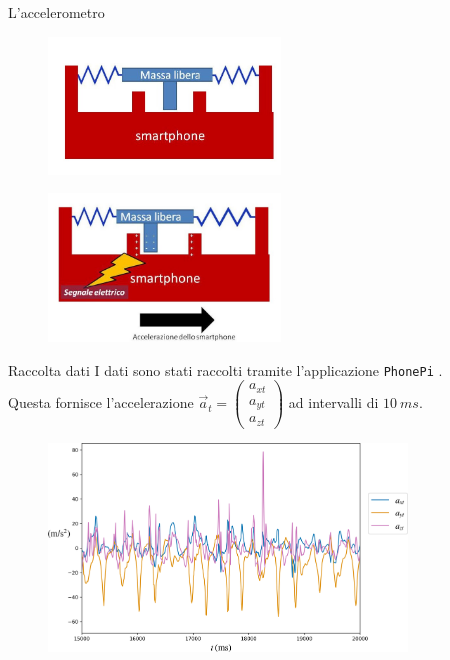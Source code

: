 \documentclass{beamer}
\begin{document}
\begin{frame}{L'accelerometro}
\begin{figure}[H]
\includegraphics[width=0.55\textwidth]{../figure/accelerometro1.jpg}
\end{figure}
\begin{figure}[H]
\hspace{10pt}\includegraphics[width=0.55\textwidth]{../figure/accelerometro2.jpg}
\end{figure}
\end{frame}

\begin{frame}{Raccolta dati}
I dati sono stati raccolti tramite l'applicazione \texttt{PhonePi} \cite{kumarPhonePiSampleServer2019}.\\
\smallskip
Questa fornisce l'accelerazione $\vec{a}_t = \begin{pmatrix}a_{xt} \\ a_{yt} \\ a_{zt}\end{pmatrix}$ ad intervalli di $\SI{10}{ms}$.
\pause
\begin{figure}[H]
\includegraphics[width=0.85\textwidth]{../figure/esempio-accel.png}
\end{figure}
\end{frame}
\end{document}
